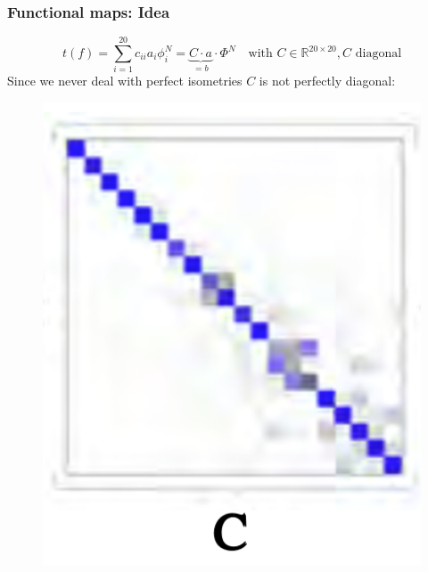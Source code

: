 \documentclass[compress]{beamer}
\begin{document}
\begin{frame}[fragile]
\frametitle{Functional maps: Idea}
$$
	t(f) = \sum_{i=1}^{20} c_{ii} a_i \phi_i^N = \underbrace{C \cdot a}_{=b} \cdot \Phi^N \quad \text{with } C \in \mathbb{R}^{20 \times 20}, C \text{ diagonal} 
$$
Since we never deal with perfect isometries $C$ is not perfectly diagonal:
\begin{figure}[h]
	\centering
	\includegraphics[width=.3\textwidth]{C.png}
\end{figure}
\end{frame}
\end{document}
